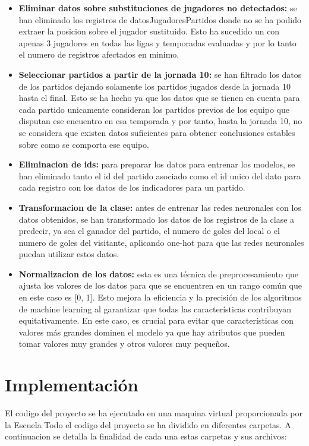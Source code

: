 \begin{itemize}
    \item \textbf{Eliminar datos sobre substituciones de jugadores no detectados:} se han eliminado los registros de datosJugadoresPartidos donde no se ha podido extraer la posicion sobre el jugador sustituido. Esto ha sucedido un con apenas 3 jugadores en todas las ligas y temporadas evaluadas y por lo tanto el numero de registros afectados en minimo.
    \item \textbf{Seleccionar partidos a partir de la jornada 10:} se han filtrado los datos de los partidos dejando solamente los partidos jugados desde la jornada 10 hasta el final. Esto se ha hecho ya que los datos que se tienen en cuenta para cada partido unicamente consideran los partidos previos de los equipo que disputan ese encuentro en esa temporada y por tanto, hasta la jornada 10, no se considera que existen datos suficientes para obtener conclusiones estables sobre como se comporta ese equipo.
    \item \textbf{Eliminacion de ids:} para preparar los datos para entrenar los modelos, se han eliminado tanto el id del partido asociado como el id unico del dato para cada registro con los datos de los indicadores para un partido.
    \item \textbf{Transformacion de la clase:} antes de entrenar las redes neuronales con los datos obtenidos, se han transformado los datos de los registros de la clase a predecir, ya sea el ganador del partido, el numero de goles del local o el numero de goles del visitante, aplicando one-hot para que las redes neuronales puedan utilizar estos datos.
    \item \textbf{Normalizacion de los datos:} esta es una técnica de preprocesamiento que ajusta los valores de los datos para que se encuentren en un rango común que en este caso es [0, 1]. Esto mejora la eficiencia y la precisión de los algoritmos de machine learning al garantizar que todas las características contribuyan equitativamente. En este caso, es crucial para evitar que características con valores más grandes dominen el modelo ya que hay atributos que pueden tomar valores muy grandes y otros valores muy pequeños.
    
\end{itemize}


\section{Implementación}
El codigo del proyecto se ha ejecutado en una maquina virtual proporcionada por la Escuela
Todo el codigo del proyecto se ha dividido en diferentes carpetas. A continuacion se detalla la finalidad de cada una estas carpetas y sus archivos: